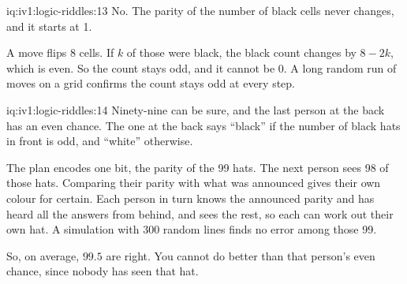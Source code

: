 \begin{solution}{iq:iv1:logic-riddles:13}
No. The parity of the number of black cells never changes, and it starts at 1.

A move flips 8 cells. If $k$ of those were black, the black count changes by $8 - 2k$, which is even. So the count stays odd, and it cannot be 0. A long random run of moves on a grid confirms the count stays odd at every step.

\end{solution}

\begin{solution}{iq:iv1:logic-riddles:14}
Ninety-nine can be sure, and the last person at the back has an even chance. The one at the back says ``black'' if the number of black hats in front is odd, and ``white'' otherwise.

The plan encodes one bit, the parity of the 99 hats. The next person sees 98 of those hats. Comparing their parity with what was announced gives their own colour for certain. Each person in turn knows the announced parity and has heard all the answers from behind, and sees the rest, so each can work out their own hat. A simulation with 300 random lines finds no error among those 99.

So, on average, $99.5$ are right. You cannot do better than that person's even chance, since nobody has seen that hat.

\end{solution}

